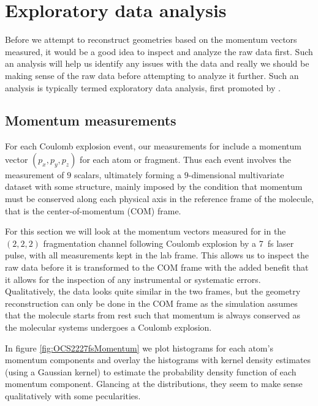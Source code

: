 
\section{Exploratory data analysis}
Before we attempt to reconstruct geometries based on the momentum vectors measured, it would be a good idea to inspect and analyze the raw data first. Such an analysis will help us identify any issues with the data and really we should be making sense of the raw data before attempting to analyze it further. Such an analysis is typically termed exploratory data analysis, first promoted by \citet{Tukey77}.

\subsection{Momentum measurements}
For each Coulomb explosion event, our measurements for  include a momentum vector $(p_x, p_y, p_z)$ for each atom or fragment. Thus each event involves the measurement of $9$ scalars, ultimately forming a $9$-dimensional multivariate dataset with some structure, mainly imposed by the condition that momentum must be conserved along each physical axis in the reference frame of the molecule, that is the center-of-momentum (COM) frame.

For this section we will look at the momentum vectors measured for  in the $(2,2,2)$ fragmentation channel following Coulomb explosion by a \SI{7}{\fs} laser pulse, with all measurements kept in the lab frame. This allows us to inspect the raw data before it is transformed to the COM frame with the added benefit that it allows for the inspection of any instrumental or systematic errors. Qualitatively, the data looks quite similar in the two frames, but the geometry reconstruction can only be done in the COM frame as the simulation assumes that the molecule starts from rest such that momentum is always conserved as the molecular systems undergoes a Coulomb explosion.

In figure \ref{fig:OCS2227fsMomentum} we plot histograms for each atom's momentum components and overlay the histograms with kernel density estimates (using a Gaussian kernel) to estimate the probability density function of each momentum component. Glancing at the distributions, they seem to make sense qualitatively with some pecularities. 

